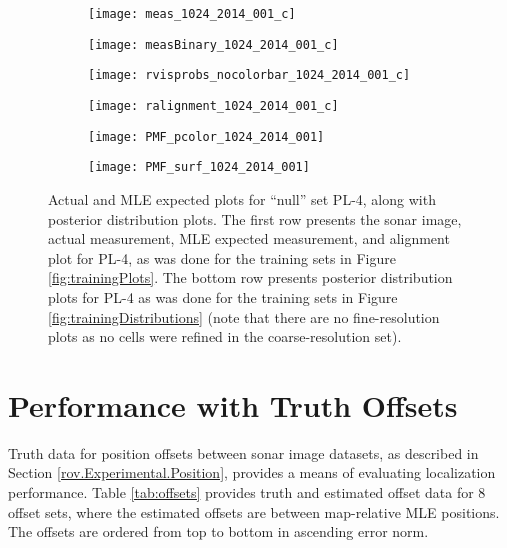 \begin{figure} [h!]
	\centering
	\begin{subfigure}[b]{0.24\textwidth}
                \texttt{[image: meas\_1024\_2014\_001\_c]}
                \caption{}
	\end{subfigure}
  	\centering
	\begin{subfigure}[b]{0.24\textwidth}
                \texttt{[image: measBinary\_1024\_2014\_001\_c]}
		\caption{}
  	\end{subfigure}
  	\centering
	\begin{subfigure}[b]{0.24\textwidth}
                \texttt{[image: rvisprobs\_nocolorbar\_1024\_2014\_001\_c]}
		\caption{}
  	\end{subfigure}
  	\centering
	\begin{subfigure}[b]{0.24\textwidth}
                \texttt{[image: ralignment\_1024\_2014\_001\_c]}
		\caption{}
  	\end{subfigure}

\centering
	\begin{subfigure}[b]{0.48\textwidth}
                \texttt{[image: PMF\_pcolor\_1024\_2014\_001]}
		\caption{}
  	\end{subfigure}
  	\centering
	\begin{subfigure}[b]{0.48\textwidth}
                \texttt{[image: PMF\_surf\_1024\_2014\_001]}
		\caption{}
  	\end{subfigure}
  	
	\caption{Actual and MLE expected plots for ``null'' set PL-4, along with posterior distribution plots. The first row presents the sonar image, actual measurement, MLE expected measurement, and alignment plot for PL-4, as was done for the training sets in Figure \ref{fig:trainingPlots}. The bottom row presents posterior distribution plots for PL-4 as was done for the training sets in Figure \ref{fig:trainingDistributions} (note that there are no fine-resolution plots as no cells were refined in the coarse-resolution set).}
	\label{fig:nullSetPlots}
\end{figure}

\section{Performance with Truth Offsets}
\label{rov.Truth}

Truth data for position offsets between sonar image datasets, as described in Section \ref{rov.Experimental.Position}, provides a means of evaluating localization performance.
Table \ref{tab:offsets} provides truth and estimated offset data for 8 offset sets, where the estimated offsets are between map-relative MLE positions.
The offsets are ordered from top to bottom in ascending error norm.

